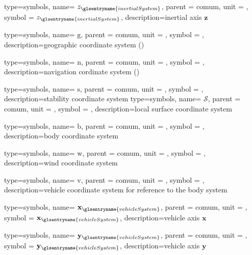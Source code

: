 {type=symbols,
	name= \ensuremath{z_{\glsentryname{inertialSystem}}},
	parent = {comum},
	unit = \unexpanded{},
	symbol = \ensuremath{z_{\glsentryname{inertialSystem}}},
	description={inertial axis $\mathbf{z}$}
}

{type=symbols,
	name= \ensuremath{\mathrm{g}},
	parent = {comum},
	unit = \unexpanded{},
	symbol = ,
	description={geographic coordinate system ()}
}

{type=symbols,
	name= \ensuremath{\mathrm{n}},
	parent = {comum},
	unit = \unexpanded{},
	symbol = ,
	description={navigation cordinate system  ()}
}

{type=symbols,
	name= \ensuremath{\mathrm{s}},
	parent = {comum},
	unit = \unexpanded{},
	symbol = ,
	description={stability coordinate system}
}
{type=symbols,
	name= \ensuremath{\mathcal{S}},
	parent = {comum},
	unit = \unexpanded{},
	symbol = ,
	description={local surface coordinate system}
}

{type=symbols,
	name= \ensuremath{\mathrm{b}},
	parent = {comum},
	unit = \unexpanded{},
	symbol = ,
	description={body coordinate system}
}

{type=symbols,
	name= \ensuremath{\mathrm{w}},
	parent = {comum},
	unit = \unexpanded{},
	symbol = ,
	description={wind coordinate system}
}

{type=symbols,
	name= \ensuremath{\mathrm{v}},
	parent = {comum},
	unit = \unexpanded{},
	symbol = ,
	description={vehicle coordinate system for reference to the body system}
}




{type=symbols,
name= \ensuremath{\mathbf{x}_{\glsentryname{vehicleSystem}}},
parent = {comum},
unit = \unexpanded{},
symbol = \ensuremath{\mathbf{x}_{\glsentryname{vehicleSystem}}},
description={vehicle axis $\mathbf{x}$}
}

{type=symbols,
name= \ensuremath{\mathbf{y}_{\glsentryname{vehicleSystem}}},
parent = {comum},
unit = \unexpanded{},
symbol = \ensuremath{\mathbf{y}_{\glsentryname{vehicleSystem}}},
description={vehicle axis $\mathbf{y}$}
}



